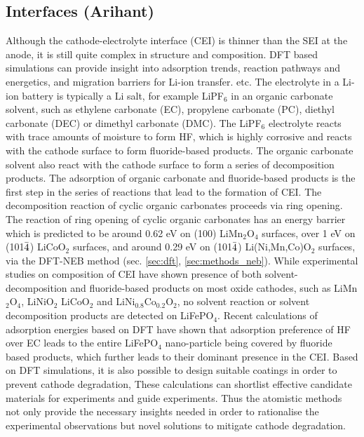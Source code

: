 \documentclass[../main.tex]{subfiles}
\begin{document}
\subsection{Interfaces (Arihant)}
\label{sec:cathode_interfaces}
Although the cathode-electrolyte interface (CEI) is thinner than the SEI at the anode, it is still quite complex in structure and composition.\cite{Gauthier2015, Edstrom2004} DFT based simulations can provide insight into adsorption trends,\cite{Bhandari2020} reaction pathways and energetics,\cite{Tebbe2015a, Tebbe2015b} and migration barriers for Li-ion transfer.\cite{Bhandari2019} etc. The electrolyte in a Li-ion battery is typically a Li salt, for example LiPF$_6$ in an organic carbonate solvent, such as ethylene carbonate (EC), propylene carbonate (PC), diethyl carbonate (DEC) or dimethyl carbonate (DMC). The LiPF$_6$ electrolyte reacts with trace amounts of moisture to form HF,\cite{Tebbe2015a} which is highly corrosive and reacts with the cathode surface to form fluoride-based products.\cite{Tebbe2015b} The organic carbonate solvent  also react with the cathode surface to form a series of decomposition products.\cite{Tebbe2016} The adsorption of organic carbonate and fluoride-based products is the first step in the series of reactions that lead to the formation of CEI. The decomposition reaction of cyclic organic carbonates proceeds via ring opening. The reaction of ring opening of cyclic organic carbonates has an energy barrier which is predicted to be around 0.62 eV on (100) LiMn$_2$O$_4$ surfaces,\cite{leung2012first} over 1 eV on (101$\Bar{4}$) LiCoO$_2$ surfaces,\cite{Tebbe2016} and around 0.29 eV on (101$\Bar{4}$) Li(Ni,Mn,Co)O$_2$ surfaces,\cite{Xu2017} via the DFT-NEB method (sec. \ref{sec:dft}, \ref{sec:methods_neb}).\cite{JONSSON1998} While experimental studies on composition of CEI have shown presence of both solvent-decomposition and fluoride-based products on most oxide cathodes, such as LiMn$_2$O$_4$, LiNiO$_2$ LiCoO$_2$ and LiNi$_{0.8}$Co$_{0.2}$O$_2$, no solvent reaction or solvent decomposition products are detected on LiFePO$_4$.\cite{Edstrom2004, Malmgren2010} Recent calculations of adsorption energies based on DFT have shown that adsorption preference of HF over EC leads to the entire LiFePO$_4$ nano-particle being covered by fluoride based products, which further leads to their dominant presence in the CEI.\cite{Bhandari2020} Based on DFT simulations, it is also possible to design suitable coatings in order to prevent cathode degradation,\cite{Tebbe2015b} These calculations can shortlist effective candidate materials for experiments and guide experiments. Thus the atomistic methods not only provide the necessary insights needed in order to rationalise the experimental observations but novel solutions to mitigate cathode degradation.
\end{document}

